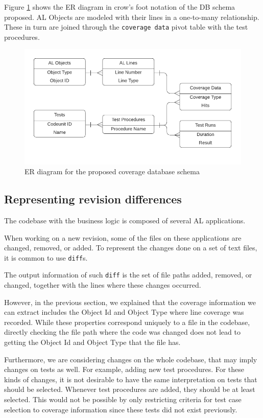 \documentclass{article}
\begin{document}
Figure \ref{fig:erdiagram} shows the ER diagram in crow's foot notation of the DB schema proposed. AL Objects are modeled with their lines in a one-to-many relationship. These in turn are joined through the \texttt{coverage data} pivot table with the test procedures.
\begin{figure}[H]
  \includegraphics[width=\textwidth]{images/erdiagram.png}
  \caption{ER diagram for the proposed coverage database schema}\label{fig:erdiagram}
\end{figure}

\subsection{Representing revision differences}\label{section:rev-diffs}

The codebase with the business logic is composed of several AL applications.

When working on a new revision, some of the files on these applications are changed, removed, or added. To represent the changes done on a set of text files, it is common to use \texttt{diff}s.

The output information of such \texttt{diff} is the set of file paths added, removed, or changed, together with the lines where these changes occurred.

However, in the previous section, we explained that the coverage information we can extract includes the Object Id and Object Type where line coverage was recorded. While these properties correspond uniquely to a file in the codebase, directly checking the file path where the code was changed does not lead to getting the Object Id and Object Type that the file has.

Furthermore, we are considering changes on the whole codebase, that may imply changes on tests as well. For example, adding new test procedures. For these kinds of changes, it is not desirable to have the same interpretation on tests that should be selected. Whenever test procedures are added, they should be at least selected. This would not be possible by only restricting criteria for test case selection to coverage information since these tests did not exist previously.
\end{document}
